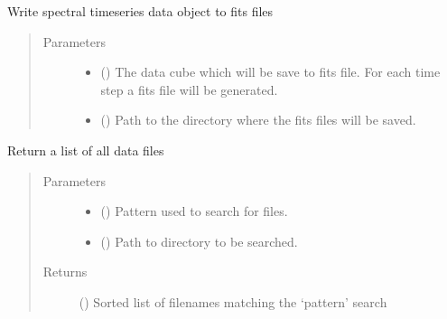 \documentclass[a4paper,10pt,english]{sphinxmanual}
\begin{document}
\begin{fulllineitems}
\label{\detokenize{cascade.utilities:cascade.utilities.utilities.write_timeseries_to_fits}}
Write spectral timeseries data object to fits files
\begin{quote}\begin{description}
\item[{Parameters}] \leavevmode\begin{itemize}
\item {} 
 () \textendash{} The data cube which will be save to fits file. For each time step
a fits file will be generated.

\item {} 
 () \textendash{} Path to the directory where the fits files will be saved.

\end{itemize}

\end{description}\end{quote}

\end{fulllineitems}


\begin{fulllineitems}
\label{\detokenize{cascade.utilities:cascade.utilities.utilities.find}}
Return  a list of all data files
\begin{quote}\begin{description}
\item[{Parameters}] \leavevmode\begin{itemize}
\item {} 
 () \textendash{} Pattern used to search for files.

\item {} 
 () \textendash{} Path to directory to be searched.

\end{itemize}

\item[{Returns}] \leavevmode
{} () \textendash{} Sorted list of filenames matching the ‘pattern’ search

\end{description}\end{quote}

\end{fulllineitems}
\end{document}
